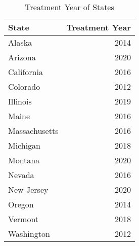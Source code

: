 \begin{table} \centering
\caption{Treatment Year of States}
\label{}
\begin{tabular}[t]{l|r}
\hline
State & Treatment Year\\
\hline
Alaska & 2014\\
\hline
Arizona & 2020\\
\hline
California & 2016\\
\hline
Colorado & 2012\\
\hline
Illinois & 2019\\
\hline
Maine & 2016\\
\hline
Massachusetts & 2016\\
\hline
Michigan & 2018\\
\hline
Montana & 2020\\
\hline
Nevada & 2016\\
\hline
New Jersey & 2020\\
\hline
Oregon & 2014\\
\hline
Vermont & 2018\\
\hline
Washington & 2012\\
\hline
\end{tabular}
\end{table}